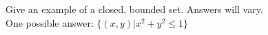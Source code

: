 {Give an example of a closed, bounded set.}
{Answers will vary.\\
One possible answer: $\{(x,y) | x^2+y^2\leq 1\}$}
